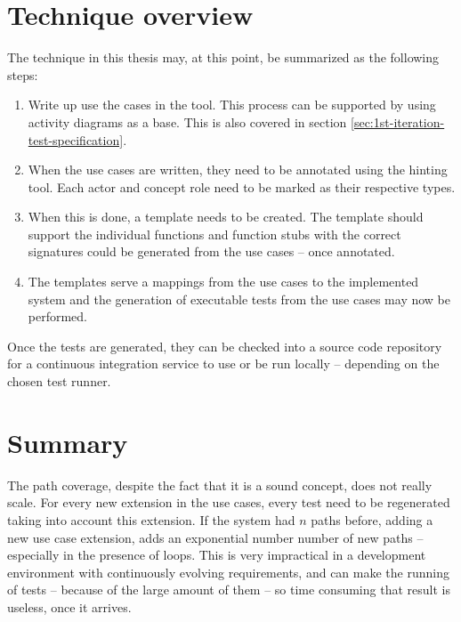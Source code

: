\section{Technique overview}
\label{sec:technique-overview}
The technique in this thesis may, at this point, be summarized as the following steps:

\begin{enumerate}

  \item Write up use the cases in the tool. This process can be supported by using activity diagrams as a base. This is also covered in section \ref{sec:1st-iteration-test-specification}.
  
  \item When the use cases are written, they need to be annotated using the hinting tool. Each actor and concept role need to be marked as their respective types.
  
  \item When this is done, a template needs to be created. The template should support the individual functions and function stubs with the correct signatures could be generated from the use cases -- once annotated.
  
\item The templates serve a mappings from the use cases to the implemented system and the generation of executable tests from the use cases may now be performed.

\end{enumerate}

Once the tests are generated, they can be checked into a source code repository for a continuous integration service to use or be run locally -- depending on the chosen test runner.\medskip

\section{Summary}
The path coverage, despite the fact that it is a sound concept, does not really scale. For every new extension in the use cases, every test need to be regenerated taking into account this extension. If the system had $n$ paths before, adding a new use case extension, adds an exponential number number of new paths -- especially in the presence of loops. This is very impractical in a development environment with continuously evolving requirements, and can make the running of tests -- because of the large amount of them -- so time consuming that result is useless, once it arrives.\medskip

